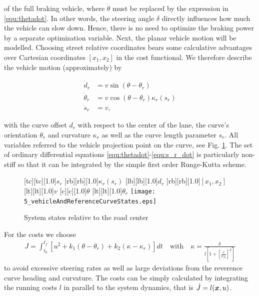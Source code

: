 of the full braking vehicle, where $\dot{\theta}$ must be replaced by the expression in \eqref{equ:thetadot}. 
In other words, the steering angle $\delta$ directly influences how much the vehicle can slow down. 
Hence, there is no need to optimize the braking power by a separate optimization variable. 
Next, the planar vehicle motion will be modelled. 
Choosing street relative coordinates bears some calculative advantages over Cartesian coordinates $[x_1,x_2]$ in the cost functional. We therefore describe the vehicle motion (approximately) by

\begin{subequations} \label{equ:dgl_mdl_nmpc_2}
\begin{align}
\label{equ:d_r_dot}
\dot d_r &= v \sin(\theta - \theta_r) \\
\dot \theta_r &= v \cos(\theta - \theta_r)\kappa_r(s_r) \\
\label{equ:s_r_dot}
\dot s_r &= v,
\end{align}
\end{subequations}

with the curve offset $d_r$ with respect to the center of the lane, the curve’s orientation $\theta_r$ and curvature $\kappa_r$  as well as the curve length parameter $s_r$.
All variables referred to the vehicle projection point on the curve, see Fig. \ref{fig:systemStates}. The set of ordinary differential equations \eqref{equ:thetadot}-\eqref{equ:s_r_dot} is particularly non-stiff so that it can be integrated by the simple first order Runge-Kutta scheme.
\begin{figure}[h]%
\centering
{}[tc][tc][1.0]{$s_r$}
    [rb][rb][1.0]{$\kappa_r(s_r)$}
    [lb][lb][1.0]{$d_r$}
    [rb][rb][1.0]{$[x_1, x_2]$}
    [lt][lt][1.0]{$v$}
    [c][c][1.0]{$\theta$}
    [lt][lt][1.0]{$\theta_r$}
    \texttt{[image: 5\_vehicleAndReferenceCurveStates.eps]}
    \caption[System states]{System states relative to the road center}
    \label{fig:systemStates}
\end{figure}%
For the costs we choose
\begin{align}
\label{equ:integralcosts}
J = \int_{t_0}^{t_f}{ \left[ u^2 + k_1 (\theta-\theta_r)+k_2(\kappa - \kappa_r) \right] }dt \quad \text{with} \quad  \kappa = \frac{\delta}{l \left[ 1 + \left[\frac{v}{v_{\text{ch}}}\right]^2\right]}
\end{align}
to avoid excessive steering rates as well as large deviations from the reverence curve heading and curvature. The costs can be simply calculated by integrating the running costs $l$ in parallel to the system dynamics, that is $\dot{J}=l(\boldsymbol{x},u)$.

